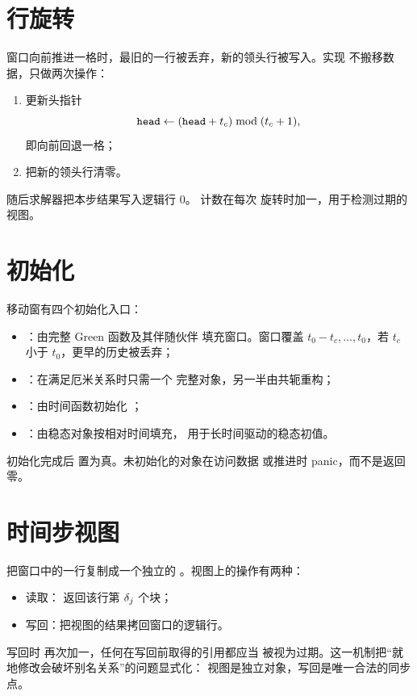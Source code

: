\section{行旋转}
\label{sec:rotation}

窗口向前推进一格时，最旧的一行被丢弃，新的领头行被写入。实现
不搬移数据，只做两次操作：
\begin{enumerate}[label=(\arabic*)]
    \item 更新头指针
          \begin{equation}
              \code{head} \leftarrow
              (\code{head} + t_c) \bmod (t_c+1),
          \end{equation}
          即向前回退一格；
    \item 把新的领头行清零。
\end{enumerate}
随后求解器把本步结果写入逻辑行 0。 计数在每次
旋转时加一，用于检测过期的视图。

\section{初始化}
\label{sec:moving-init}

移动窗有四个初始化入口：
\begin{itemize}
    \item {}：由完整 Green 函数及其伴随伙伴
          填充窗口。窗口覆盖 $t_0-t_c,\dots,t_0$，若 $t_c$ 小于
          $t_0$，更早的历史被丢弃；
    \item {}：在满足厄米关系时只需一个
          完整对象，另一半由共轭重构；
    \item {}：由时间函数初始化
          ；
    \item {}：由稳态对象按相对时间填充，
          用于长时间驱动的稳态初值。
\end{itemize}
初始化完成后  置为真。未初始化的对象在访问数据
或推进时 panic，而不是返回零。

\section{时间步视图}
\label{sec:moving-view}

 把窗口中的一行复制成一个独立的
。视图上的操作有两种：
\begin{itemize}
    \item 读取： 返回该行第 $\delta_j$ 个块；
    \item 写回：把视图的结果拷回窗口的逻辑行。
\end{itemize}
写回时  再次加一，任何在写回前取得的引用都应当
被视为过期。这一机制把“就地修改会破坏别名关系”的问题显式化：
视图是独立对象，写回是唯一合法的同步点。

